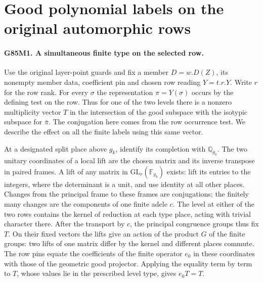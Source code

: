\section{Good polynomial labels on the original automorphic rows}

\paragraph{G85M1. A simultaneous finite type on the selected row.}
Use the original layer-point guards and fix a member $D=w.D(Z)$,
its nonempty member data, coefficient pin and chosen row reading
$Y=t.r.Y$. Write $r$ for the row rank. For every $\sigma$ the
representation $\pi=Y(\sigma)$ occurs by the defining test on the
row. Thus for one of the two levels there is a nonzero multiplicity
vector $T$ in the intersection of the good subspace with the
isotypic subspace for $\bar\pi$. The conjugation here comes from
the row occurrence test. We describe the effect on all the finite
labels using this same vector.

At a designated split place above $g_k$, identify its completion with
$\mathbb Q_{g_k}$. The two unitary coordinates of a local lift are
the chosen matrix and its inverse transpose in paired frames. A lift
of any matrix in $\mathrm{GL}_r(\mathbb F_{g_k})$ exists: lift its
entries to the integers, where the determinant is a unit, and use
identity at all other places. Changes from the principal frame to
these frames are conjugations; the finitely many changes are the
components of one finite adele $c$. The level at either of the two
rows contains the kernel of reduction at each type place, acting
with trivial character there. After the transport by $c$, the
principal congruence groups thus fix $T$. On their fixed vectors the
lifts give an action of the product $G$ of the finite groups: two
lifts of one matrix differ by the kernel and different places
commute. The row pins equate the coefficients of the finite
operator $e_0$ in these coordinates with those of the geometric
good projector. Applying the equality term by term to $T$, whose
values lie in the prescribed level type, gives $e_0T=T$.

